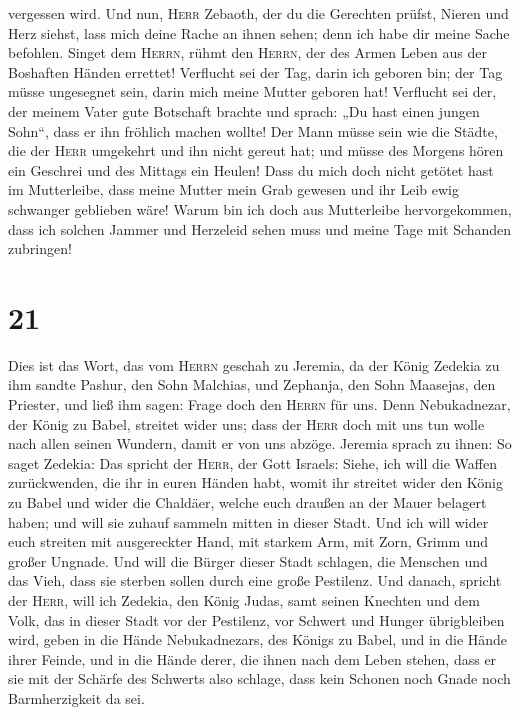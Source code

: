 vergessen wird.  Und nun, \textsc{Herr} Zebaoth, der du
die Gerechten prüfst, Nieren und Herz siehst, lass mich deine Rache an
ihnen sehen; denn ich habe dir meine Sache befohlen. 
Singet dem \textsc{Herrn}, rühmt den \textsc{Herrn}, der des Armen Leben
aus der Boshaften Händen errettet!  Verflucht sei der
Tag, darin ich geboren bin; der Tag müsse ungesegnet sein, darin mich
meine Mutter geboren hat!  Verflucht sei der, der meinem
Vater gute Botschaft brachte und sprach: „Du hast einen jungen Sohn``,
dass er ihn fröhlich machen wollte!  Der Mann müsse sein
wie die Städte, die der \textsc{Herr} umgekehrt und ihn nicht gereut
hat; und müsse des Morgens hören ein Geschrei und des Mittags ein
Heulen!  Dass du mich doch nicht getötet hast im
Mutterleibe, dass meine Mutter mein Grab gewesen und ihr Leib ewig
schwanger geblieben wäre!  Warum bin ich doch aus
Mutterleibe hervorgekommen, dass ich solchen Jammer und Herzeleid sehen
muss und meine Tage mit Schanden zubringen!

\hypertarget{section-20}{%
\section{21}\label{section-20}}

 Dies ist das Wort, das vom \textsc{Herrn} geschah zu
Jeremia, da der König Zedekia zu ihm sandte Pashur, den Sohn Malchias,
und Zephanja, den Sohn Maasejas, den Priester, und ließ ihm sagen:
 Frage doch den \textsc{Herrn} für uns. Denn Nebukadnezar,
der König zu Babel, streitet wider uns; dass der \textsc{Herr} doch mit
uns tun wolle nach allen seinen Wundern, damit er von uns abzöge.
 Jeremia sprach zu ihnen: So saget Zedekia: 
Das spricht der \textsc{Herr}, der Gott Israels: Siehe, ich will die
Waffen zurückwenden, die ihr in euren Händen habt, womit ihr streitet
wider den König zu Babel und wider die Chaldäer, welche euch draußen an
der Mauer belagert haben; und will sie zuhauf sammeln mitten in dieser
Stadt.  Und ich will wider euch streiten mit ausgereckter
Hand, mit starkem Arm, mit Zorn, Grimm und großer Ungnade.
 Und will die Bürger dieser Stadt schlagen, die Menschen
und das Vieh, dass sie sterben sollen durch eine große Pestilenz.
 Und danach, spricht der \textsc{Herr}, will ich Zedekia,
den König Judas, samt seinen Knechten und dem Volk, das in dieser Stadt
vor der Pestilenz, vor Schwert und Hunger übrigbleiben wird, geben in
die Hände Nebukadnezars, des Königs zu Babel, und in die Hände ihrer
Feinde, und in die Hände derer, die ihnen nach dem Leben stehen, dass er
sie mit der Schärfe des Schwerts also schlage, dass kein Schonen noch
Gnade noch Barmherzigkeit da sei.

